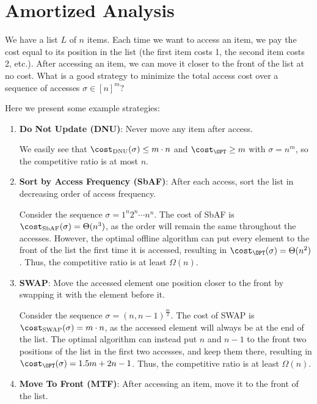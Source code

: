 \section{Amortized Analysis}

\begin{question}
  We have a list $L$ of $n$ items. Each time we want to access an item, we pay the cost equal to its position in the list (the first item costs 1, the second item costs 2, etc.). After accessing an item, we can move it closer to the front of the list at no cost. What is a good strategy to minimize the total access cost over a sequence of accesses $\sigma \in [n]^m$?
\end{question}

Here we present some example strategies:

\begin{enumerate}
  \item \textbf{Do Not Update (DNU)}: Never move any item after access.

    We easily see that $\cost_{\text{DNU}}(\sigma) \leq m \cdot n$ and $\cost_{\OPT} \geq m$ with $\sigma = n^m$, so the competitive ratio is at most $n$.
  \item \textbf{Sort by Access Frequency (SbAF)}: After each access, sort the list in decreasing order of access frequency.

    Consider the sequence $\sigma = 1^n 2^n \cdots n^n$. The cost of SbAF is $\cost_{\text{SbAF}}(\sigma) = \Theta(n^3)$, as the order will remain the same throughout the accesses. However, the optimal offline algorithm can put every element to the front of the list the first time it is accessed, resulting in $\cost_{\OPT}(\sigma) = \Theta(n^2)$. Thus, the competitive ratio is at least $\Omega(n)$.
  \item \textbf{SWAP}: Move the accessed element one position closer to the front by swapping it with the element before it.

    Consider the sequence $\sigma = (n, n-1)^{\frac{m}{2}}$. The cost of SWAP is $\cost_{\text{SWAP}}(\sigma) = m\cdot n$, as the accessed element will always be at the end of the list. The optimal algorithm can instead put $n$ and $n-1$ to the front two positions of the list in the first two accesses, and keep them there, resulting in $\cost_{\OPT}(\sigma) = 1.5m+2n-1$. Thus, the competitive ratio is at least $\Omega(n)$.
  \item \textbf{Move To Front (MTF)}: After accessing an item, move it to the front of the list.

\end{enumerate}

